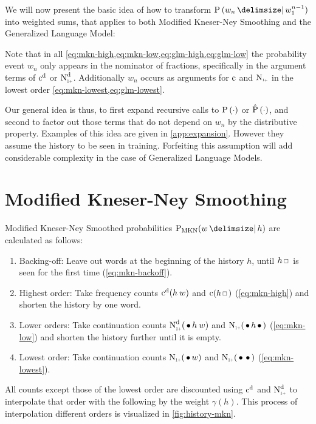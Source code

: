 We will now present the basic idea of how to transform $\Prob{w_n}{w_1^{n-1}}$
into weighted sums, that applies to both Modified Kneser-Ney Smoothing and
the Generalized Language Model:

Note that in all \cref{eq:mkn-high,eq:mkn-low,eq:glm-high,eq:glm-low} the
probability event $w_n$ only appears in the nominator of fractions, specifically
in the argument terms of $\DiscountedCount$ or $\DiscountedCount*$.
Additionally $w_n$ occurs as arguments for $\operatorname{c}$ and $\ContCountIp$ in the
lowest order \cref{eq:mkn-lowest,eq:glm-lowest}.

Our general idea is thus, to first expand recursive calls to
$\Prob(\DummyArg)$ or $\Prob*(\DummyArg)$, and second to factor
out those terms that do not depend on $w_n$ by the distributive property.
Examples of this idea are given in \cref{app:expansion}.
However they assume the history to be seen in training.
Forfeiting this assumption will add considerable complexity in the case
of Generalized Language Models.


\section{Modified Kneser-Ney Smoothing}

Modified Kneser-Ney Smoothed probabilities $\ProbMKN{w}{h}$ are calculated as
follows:
\begin{enumerate}
  \item Backing-off: Leave out words at the beginning of the history $h$, until
    $h \Skp$ is seen for the first time (\cref{eq:mkn-backoff}).
  \item Highest order: Take frequency counts $\DiscountedCount(h \: w)$ and
    $\Count(h \Skp)$ (\cref{eq:mkn-high}) and shorten the history by one word.
  \item Lower orders: Take continuation counts $\DiscountedCount*(\WSkp h \: w)$
    and $\ContCountIp(\WSkp h \WSkp)$ (\cref{eq:mkn-low}) and shorten the
    history further until it is empty.
  \item Lowest order: Take continuation counts $\ContCountIp(\WSkp w)$ and
    $\ContCountIp(\WSkp \WSkp)$ (\cref{eq:mkn-lowest}).
\end{enumerate}
All counts except those of the lowest order are discounted using
$\DiscountedCount$ and $\DiscountedCount*$ to interpolate that order with the
following by the weight $\gamma(h)$.
This process of interpolation different orders is visualized in
\cref{fig:history-mkn}.

